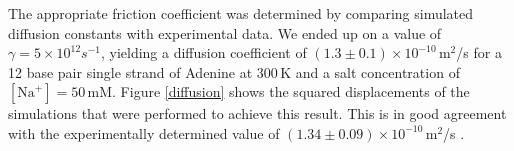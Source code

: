 The appropriate friction coefficient was determined by comparing simulated diffusion constants with experimental data. We ended up on a value of $\gamma = 5 \times 10^{12} s^{-1}$, yielding a diffusion coefficient of $(1.3 \pm 0.1) \times 10^{-10}$\,m$^2$/s for a 12 base pair single strand of Adenine at 300\,K and a salt concentration of $[\text{Na}^+] = 50$\,mM.
Figure \ref{diffusion} shows the squared displacements of the simulations that were performed to achieve this result. This is in good agreement with the experimentally determined value of $(1.34 \pm 0.09) \times 10^{-10}$\,m$^2$/s \cite{stellwagen2001measuring, bonifacio1997comparison, eimer1991rotational}. 



